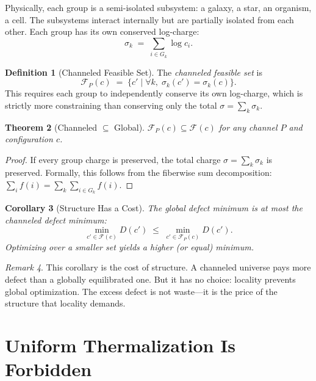 \documentclass[11pt,a4paper]{article}
\theoremstyle{plain}
\newtheorem{theorem}{Theorem}[section]
\newtheorem{corollary}[theorem]{Corollary}
\theoremstyle{definition}
\newtheorem{definition}[theorem]{Definition}
\theoremstyle{remark}
\newtheorem{remark}[theorem]{Remark}
\newcommand{\F}{\mathcal{F}}
\begin{document}
Physically, each group is a semi-isolated subsystem: a galaxy, a star, an organism, a cell.
The subsystems interact internally but are partially isolated from each other.
Each group has its own conserved log-charge:
\[
\sigma_k \;=\; \sum_{i \in G_k} \log c_i.
\]

\begin{definition}[Channeled Feasible Set]\label{def:channeledfeasible}
The \emph{channeled feasible set} is
\[
\F_P(c) \;=\; \bigl\{c' \mid \forall k,\; \sigma_k(c') = \sigma_k(c)\bigr\}.
\]
This requires each group to independently conserve its own log-charge, which is strictly more constraining than conserving only the total $\sigma = \sum_k \sigma_k$.
\end{definition}

\begin{theorem}[Channeled $\subseteq$ Global]\label{thm:subset}
$\F_P(c) \subseteq \F(c)$ for any channel $P$ and configuration $c$.
\end{theorem}

\begin{proof}
If every group charge is preserved, the total charge $\sigma = \sum_k \sigma_k$ is preserved.
Formally, this follows from the fiberwise sum decomposition: $\sum_i f(i) = \sum_k \sum_{i \in G_k} f(i)$.
\end{proof}

\begin{corollary}[Structure Has a Cost]\label{cor:cost}
The global defect minimum is at most the channeled defect minimum:
\[
\min_{c' \in \F(c)} D(c') \;\le\; \min_{c' \in \F_P(c)} D(c').
\]
Optimizing over a smaller set yields a higher (or equal) minimum.
\end{corollary}

\begin{remark}
This corollary is the cost of structure.
A channeled universe pays more defect than a globally equilibrated one.
But it has no choice: locality prevents global optimization.
The excess defect is not waste---it is the price of the structure that locality demands.
\end{remark}

\section{Uniform Thermalization Is Forbidden}\label{sec:forbidden}
\end{document}
